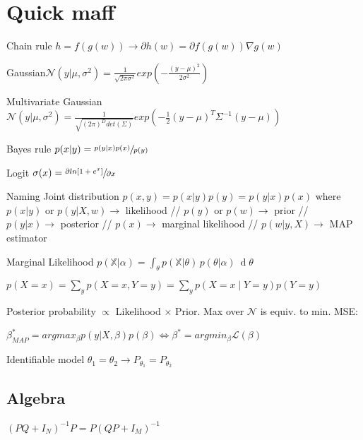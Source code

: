 \section{Quick maff}
Chain rule $h = f(g(w)) \rightarrow \partial h(w) = \partial f(g(w)) \nabla g(w)$

Gaussian\newline $\mathcal{N}(y|\mu, \sigma^2) = \frac{1}{\sqrt{2\pi \sigma^2}} exp(-\frac{(y-\mu)^2}{2\sigma^2})$

Multivariate Gaussian $\mathcal{N}(y|\mu, \sigma^2) = \frac{1}{\sqrt{(2\pi)^D det(\Sigma)}} exp(-\frac{1}{2} (y-\mu)^T \Sigma^{-1} (y-\mu))$

Bayes rule $p(x|y) = \sfrac{p(y|x) p(x)}{p(y)}$

Logit $\sigma(x) = \sfrac{\partial ln[1+e^x]}{\partial x}$

Naming
Joint distribution $p(x,y) = p(x|y)p(y) = p(y|x)p(x)$ where
$p(x|y) \text{ or } p(y|X,w) \rightarrow$ likelihood 
// $p(y)  \text{ or } p(w) \rightarrow$ prior
// $p(y|x) \rightarrow$ posterior
// $p(x) \rightarrow$ marginal likelihood
// $p(w|y,X) \rightarrow$ MAP estimator 

Marginal Likelihood \newline $p({\mathbb  {X}}|\alpha )=\int _{\theta }p({\mathbb  {X}}|\theta )\,p(\theta |\alpha )\ \operatorname {d}\!\theta $

$p(X=x)=\sum_{y} p(X=x,Y=y) = \sum_{y} p(X=x \mid Y=y) p(Y=y)$

Posterior probability $\propto$ Likelihood $\times$ Prior. Max over $\mathcal{N}$ is equiv. to min. MSE: 

$\beta_{MAP}^* = arg max_{\beta} p(y|X,\beta)p(\beta) \Leftrightarrow \beta^* = arg min_{\beta} \mathcal{L}(\beta)$

Identifiable model \newline
$\theta_1 = \theta_2 \rightarrow P_{\theta_1} = P_{\theta_2}$

\subsection{Algebra}
$(PQ + I_N)^{-1} P = P (QP + I_M)^{-1}$

